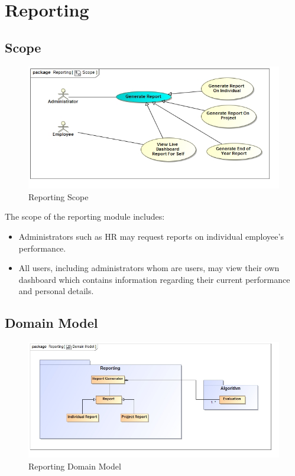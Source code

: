 \documentclass[11pt,a4paper]{article}
\begin{document}
\pagebreak

\section{Reporting}
\subsection{Scope}
\begin{figure}[H]
	\begin{center}
		\includegraphics[scale=0.75]{../Images/Reporting_Scope.jpg}
		\caption{Reporting Scope}
	\end{center}
\end{figure}
The scope of the reporting module includes:
\begin{itemize}
	\item Administrators such as HR may request reports on individual employee's performance.
	\item All users, including administrators whom are users, may view their own dashboard which contains information regarding their current performance and personal details.
\end{itemize}

\subsection{Domain Model}
\begin{figure}[H]
	\begin{center}
		\includegraphics[scale=0.55]{../Images/Report_Domain.jpg}
		\caption{Reporting Domain Model}
	\end{center}
\end{figure}
\end{document}
